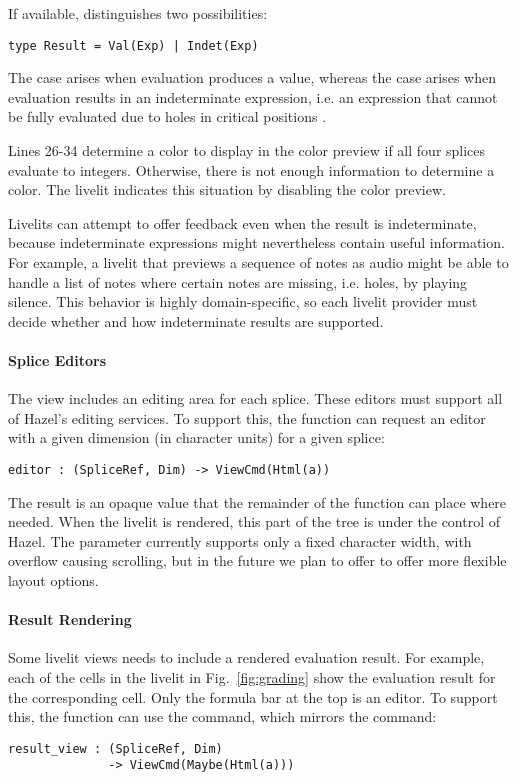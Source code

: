 If available,  distinguishes two possibilities:
\begin{lstlisting}[numbers=none]
type Result = Val(Exp) | Indet(Exp)
\end{lstlisting}
The  case arises when evaluation produces a value, whereas the 
 case arises when evaluation results in an indeterminate expression,
i.e. an expression that cannot be fully evaluated due to holes 
in critical positions \cite{HazelnutLive}.

Lines 26-34 determine a color to display in the color preview 
if all four splices evaluate to integers. Otherwise, there is not 
enough information to determine a color. The livelit 
indicates this situation by disabling the color preview.

Livelits can attempt to offer feedback even when the result is indeterminate,
because indeterminate expressions might nevertheless contain useful information.
For example, a livelit that previews a sequence of notes as audio might be able 
to handle a list of notes where certain notes are missing, i.e. holes, by 
playing silence.
This behavior is highly domain-specific, so each livelit provider must decide 
whether and how indeterminate results are supported.

\paragraph{Splice Editors}
The view includes an editing area for each splice. These editors must support all of 
Hazel's editing services. To support this, the  function
can request an editor with a given dimension (in character units) for a given splice:
\begin{lstlisting}[numbers=none]
editor : (SpliceRef, Dim) -> ViewCmd(Html(a))
\end{lstlisting}
The result is an opaque  value that the remainder of the function 
can place where needed. When the livelit is rendered, this part of the tree is 
under the control of Hazel. The  parameter currently supports only a fixed
character width, with overflow causing scrolling, but in the future we plan to offer 
to offer more flexible layout options.

\paragraph{Result Rendering}
Some livelit views needs to include 
a rendered evaluation result. For example, each of the cells in the 
livelit in Fig.~\ref{fig:grading} show the evaluation result for the corresponding 
cell. Only the formula bar at the top is an editor. To support this, the 
function can use the  command, which mirrors the  command:
\begin{lstlisting}[numbers=none]
result_view : (SpliceRef, Dim) 
              -> ViewCmd(Maybe(Html(a)))
\end{lstlisting}
